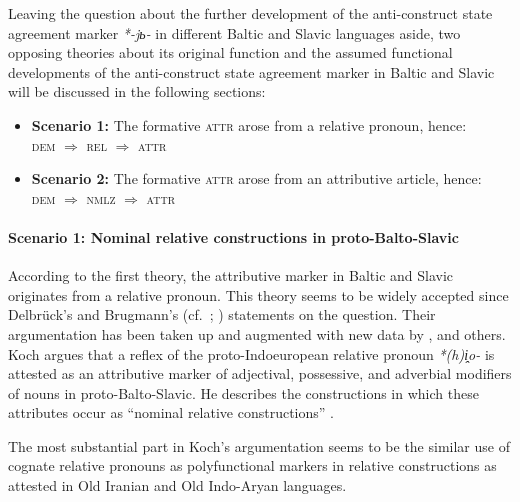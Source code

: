 Leaving the question about the further development of the anti-construct state agreement marker \textit{*-jь-} in different Baltic and Slavic languages aside, two opposing theories about its original function and the assumed functional developments of the anti-construct state agreement marker in Baltic and Slavic will be discussed in the following sections:
\begin{itemize}
\item \textbf{Scenario 1:} The formative \textsc{attr} arose from a relative pronoun, hence:\\
\textsc{dem $\Rightarrow$ rel $\Rightarrow$ attr}
\item \textbf{Scenario 2:} The formative \textsc{attr} arose from an attributive article, hence:\\
\textsc{dem $\Rightarrow$ nmlz $\Rightarrow$ attr}
\label{2paths}
\end{itemize}

\paragraph{Scenario 1: Nominal relative constructions in proto-Balto-Slavic} According to the first theory, the attributive marker in Baltic and Slavic originates from a relative pronoun. This theory seems to be widely accepted since Delbrück's and Brugmann's (cf.~\citealt[432–433]{delbruck1893}; \citealt[331, 344]{brugmann-etal1916}) statements on the question. Their argumentation has been taken up and augmented with new data by \citet{schmidt1959}, \citet{koch1992,koch1999} and others. Koch argues that a reflex of the proto-Indoeuropean relative pronoun \textit{*(h)i̭o-} is attested as an attributive marker of adjectival, possessive, and adverbial modifiers of nouns in proto-Balto-Slavic. He describes the constructions in which these attributes occur as “nominal relative constructions” \cite[470, elsewhere]{koch1999}.

The most substantial part in Koch's argumentation seems to be the similar use of cognate relative pronouns as polyfunctional markers in relative constructions as attested in Old Iranian and Old Indo-Aryan languages.

